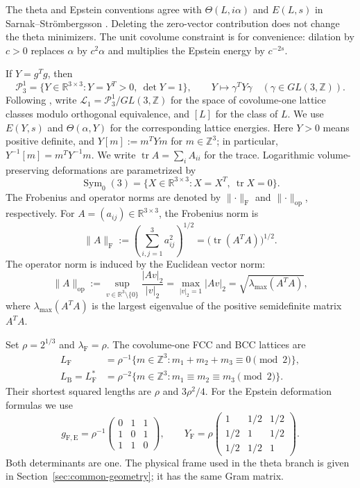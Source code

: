 \documentclass[reqno,english]{amsart}
\theoremstyle{definition}
\newtheorem{open problem}[theorem]{Open Problem}
\theoremstyle{remark}
\theoremstyle{plain}
\newcommand{\R}{{\mathbb R}}
\numberwithin{equation}{section}
\newcommand{\Z}{\mathbb Z}
\newcommand{\FCC}{L_{\mathrm F}}
\newcommand{\B}{L_{\mathrm B}}
\newcommand{\YF}{Y_{\mathrm F}}
\newcommand{\PP}{\mathcal P_3^1}
\newcommand{\tr}{\operatorname{tr}}
\newcommand{\norm}[1]{\lVert#1\rVert_{\mathrm F}}
\newcommand{\opnorm}[1]{\lVert#1\rVert_{\mathrm{op}}}
\newcommand{\lam}{\lambda_{\mathrm F}}
\newcommand{\Th}{\Theta}
\newcommand{\gFE}{g_{\mathrm F,\mathrm E}}
\newcommand{\Symzero}{\operatorname{Sym}_0(3)}
\newcommand{\Lone}{\mathscr L_1}
\begin{document}
The theta and Epstein conventions agree with $\Th(L,i\alpha)$ and
$E(L,s)$ in Sarnak--Str\"{o}mbergsson \cite[(39) and (1)]{SS}.
Deleting the zero-vector contribution does not change the theta minimizers.
The unit covolume constraint is for convenience: dilation by $c>0$ replaces $\alpha$
by $c^2\alpha$ and multiplies the Epstein energy by $c^{-2s}$.

If $Y=g^Tg$, then
\begin{equation}
\label{p31}
 \PP=\{Y\in\R^{3\times3}:Y=Y^T>0,\ \det Y=1\},
 \qquad Y\longmapsto\gamma^TY\gamma\quad(\gamma\in GL(3,\Z)).
\end{equation}
Following \cite[Section~1]{SS}, write $\Lone=\PP/GL(3,\Z)$ for the
space of covolume-one lattice classes modulo orthogonal equivalence,
and $[L]$ for the class of $L$. We use $E(Y,s)$ and $\Th(\alpha,Y)$ for the corresponding
lattice energies. Here $Y>0$ means positive definite, and
$Y[m]:=m^TYm$ for $m\in\Z^3$; in particular,
$Y^{-1}[m]=m^TY^{-1}m$. We write $\tr A=\sum_i A_{ii}$ for the trace.
Logarithmic volume-preserving deformations are parametrized by
\[
 \Symzero=\{X\in\R^{3\times3}:X=X^T,\ \tr X=0\}.
\]
The Frobenius and operator norms are denoted by $\norm{\cdot}$ and
$\opnorm{\cdot}$, respectively.
For $A=(a_{ij})\in\R^{3\times3}$, the Frobenius norm is
\[
 \norm{A}
 :=\left(\sum_{i,j=1}^3a_{ij}^2\right)^{1/2}
 =\bigl(\tr(A^TA)\bigr)^{1/2}.
\]
The operator norm is induced by the Euclidean vector norm:
\[
 \opnorm{A}
 :=\sup_{v\in\R^3\setminus\{0\}}\frac{|Av|_2}{|v|_2}
 =\max_{|v|_2=1}|Av|_2
 =\sqrt{\lambda_{\max}(A^TA)},
\]
where $\lambda_{\max}(A^TA)$ is the largest eigenvalue of the positive
semidefinite matrix $A^TA$.

Set $\rho=2^{1/3}$ and $\lam=\rho$. The covolume-one FCC and BCC lattices are
\begin{align}
 \FCC&=\rho^{-1}\{m\in\Z^3:m_1+m_2+m_3\equiv0\pmod2\},\label{E:eq:FCC}\\
 \B=\FCC^*&=\rho^{-2}\{m\in\Z^3:m_1\equiv m_2\equiv m_3\pmod2\}.
 \label{E:eq:BCC}
\end{align}
Their shortest squared lengths are $\rho$ and $3\rho^2/4$.
For the Epstein deformation formulas we use
\begin{equation}\label{eq:epstein-frame}
 \gFE=\rho^{-1}\begin{pmatrix}0&1&1\\1&0&1\\1&1&0\end{pmatrix},
 \qquad
 \YF=\rho\begin{pmatrix}1&1/2&1/2\\1/2&1&1/2\\1/2&1/2&1\end{pmatrix}.
\end{equation}
Both determinants are one. The physical frame used in the theta branch
is given in Section~\ref{sec:common-geometry}; it has the same Gram matrix.
\end{document}
